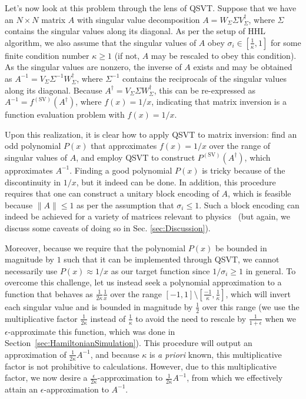 \documentclass[aps,pra,showpacs,notitlepage,twocolumn,superscriptaddress,nofootinbib]{revtex4-1}
\begin{document}
    Let's now look at this problem through the lens of QSVT. Suppose that we have an $N \times N$ matrix $A$ with singular value decomposition $A = W_\Sigma \Sigma V^\dag_\Sigma$, where $\Sigma$ contains the singular values along its diagonal. As per the setup of HHL algorithm, we also assume that the singular values of $A$ obey $\sigma_i \in [\frac{1}{\kappa}, 1]$ for some finite condition number $\kappa \geq 1$ (if not, $A$ may be rescaled to obey this condition). As the singular values are nonzero, the inverse of $A$ exists and may be obtained as $A^{-1} = V_\Sigma \Sigma^{-1} W^\dag_\Sigma$, where $\Sigma^{-1}$ contains the reciprocals of the singular values along its diagonal. Because $A^\dag = V_\Sigma \Sigma W^\dag_\Sigma$, this can be re-expressed as $A^{-1} = f^{(\text{SV})}(A^\dag)$, where $f(x)=1/x$, indicating that matrix inversion is a function evaluation problem with $f(x) = 1/x$. 
    
    Upon this realization, it is clear how to apply QSVT to matrix inversion: find an odd polynomial $P(x)$ that approximates $f(x) = 1/x$ over the range of singular values of $A$, and employ QSVT to construct $P^{(\text{SV})}(A^\dag)$, which approximates $A^{-1}$. Finding a good polynomial $P(x)$ is tricky because of the discontinuity in $1/x$, but it indeed can be done. In addition, this procedure requires that one can construct a unitary block encoding of $A$, which is feasible because $\|A\| \leq 1$ as per the assumption that $\sigma_i \leq 1$. Such a block encoding can indeed be achieved for a variety of matrices relevant to physics~\cite{Gily_n_2019, Low_2019} (but again, we discuss some caveats of doing so in Sec. \ref{sec:Discussion}).
    
    Moreover, because we require that the polynomial $P(x)$ be bounded in magnitude by $1$ such that it can be implemented through QSVT, we cannot necessarily use $P(x)\approx 1/x$ as our target function since $1/\sigma_i \geq 1$ in general. To overcome this challenge, let us instead seek a polynomial approximation to a function that behaves as $\frac{1}{2\kappa} \frac{1}{x}$ over the range $[-1,1] \setminus [\frac{-1}{\kappa}, \frac{1}{\kappa}]$, which will invert each singular value and is bounded in magnitude by $\frac{1}{2}$ over this range (we use the multiplicative factor $\frac{1}{2\kappa}$ instead of $\frac{1}{\kappa}$ to avoid the need to rescale by $\frac{1}{1+\epsilon}$ when we $\epsilon$-approximate this function, which was done in Section~\ref{sec:HamiltonianSimulation}). This procedure will output an approximation of $\frac{1}{2 \kappa} A^{-1}$, and because $\kappa$ is \emph{a priori} known, this multiplicative factor is not prohibitive to calculations. However, due to this multiplicative factor, we now desire a $\frac{\epsilon}{2 \kappa}$-approximation to $\frac{1}{2 \kappa} A^{-1}$, from which we effectively attain an $\epsilon$-approximation to $A^{-1}$.  
    
\end{document}
